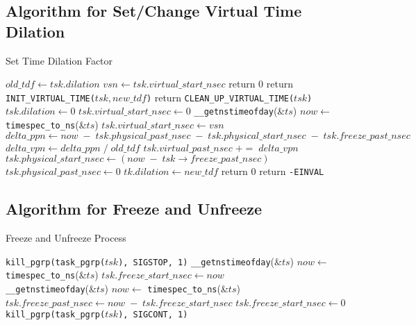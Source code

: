\documentclass{acm_proc_article-sp}
\begin{document}
\subsection{Algorithm for Set/Change Virtual Time Dilation}
\begin{algorithm*}[t]
\caption{Set Time Dilation Factor}
\label{Alg-SetTDF}
\begin{algorithmic}[1]
\State $old\_tdf \gets tsk.dilation$
\State $vsn \gets tsk.virtual\_start\_nsec$
	\State return 0
	\State return \texttt{\uppercase{init\_virtual\_time}($tsk, new\_tdf$)}
	\State return \texttt{\uppercase{clean\_up\_virtual\_time}($tsk$)}
	\State $tsk.dilation \gets 0$
	\State $tsk.virtual\_start\_nsec \gets 0$
	\State \texttt{\_\_getnstimeofday}(\&$ts$)
	\State $now \gets$ \texttt{timespec\_to\_ns}(\&$ts$)
	\State $tsk.virtual\_start\_nsec \gets vsn$
	\State $delta\_ppn \gets now \; - \; tsk.physical\_past\_nsec \; - \; tsk. physical\_start\_nsec \; - \; tsk. freeze\_past\_nsec$
	\State $delta\_vpn \gets delta\_ppn \; / \; old\_tdf$
	\State $tsk.virtual\_past\_nsec \; += \; delta\_vpn$
	\State $tsk.physical\_start\_nsec \gets (now \; - \; tsk\rightarrow freeze\_past\_nsec)$
	\State $tsk.physical\_past\_nsec \gets 0$
	\State $tk.dilation \gets new\_tdf$
	\State return 0
\Else
	\State return \texttt{-EINVAL}
\EndIf
\EndFunction
\end{algorithmic}
\end{algorithm*}

\subsection{Algorithm for Freeze and Unfreeze}
\begin{algorithm*}[t]
\caption{Freeze and Unfreeze Process}%
\label{Alg-Freeze}
\begin{algorithmic}[1]
\State \texttt{kill\_pgrp(task\_pgrp($tsk$), SIGSTOP, 1)}
\State \texttt{\_\_getnstimeofday}(\&$ts$)
\State $now \gets$ \texttt{timespec\_to\_ns}(\&$ts$)
\State $tsk.freeze\_start\_nsec \gets now$
\EndFunction
\\
\State \texttt{\_\_getnstimeofday}(\&$ts$)
\State $now \gets$ \texttt{timespec\_to\_ns}(\&$ts$)
\State $tsk.freeze\_past\_nsec \gets now \; - \; tsk.freeze\_start\_nsec$
\State $tsk.freeze\_start\_nsec \gets 0$
\State \texttt{kill\_pgrp(task\_pgrp($tsk$), SIGCONT, 1)}
\EndFunction
\end{algorithmic}
\end{algorithm*}
\end{document}
